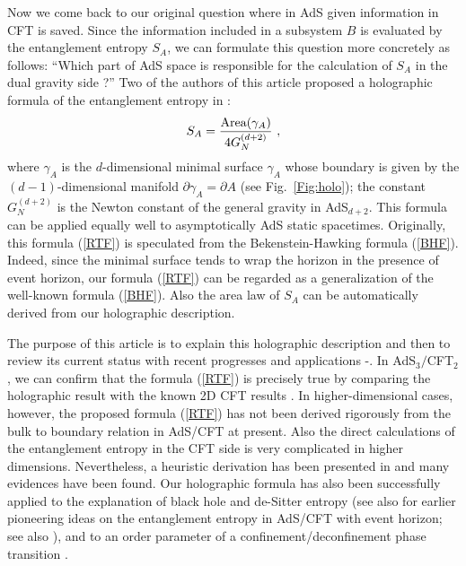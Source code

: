 \documentclass[12pt]{article}
\def\frac#1#2{{#1\over #2}}
\def\de{\partial}
\def\f {\frac}
\def\frac#1#2{{#1\over #2}}
\def\be{\begin{equation}}
\def\ee{\end{equation}}
\begin{document}
Now we come back to our original question where in AdS
given information in CFT is saved.
Since the information included in a subsystem $B$ is evaluated by the entanglement
entropy $S_A$, we can formulate this question more concretely as follows: ``Which part of
AdS space is responsible for the calculation of $S_A$ in the dual gravity side ?''
Two of the authors of this article proposed a holographic formula of the entanglement entropy
in \cite{RuTa,RuTaL}:
\be
S_A=\f{\mbox{Area}(\gamma_A)}{4G^{(d+2)}_N}\ , \label{RTF}
\ee
where $\gamma_A$ is the $d$-dimensional minimal surface $\gamma_A$ whose boundary is given
by the $(d-1)$-dimensional manifold
$\de \gamma_A=\de A$
(see Fig.\ \ref{Fig:holo}); the constant $G^{(d+2)}_N$ is
the Newton constant of the general gravity in AdS$_{d+2}$.
This formula can be applied equally well to asymptotically
AdS static spacetimes. Originally, this formula (\ref{RTF}) is speculated from
the Bekenstein-Hawking formula (\ref{BHF}). Indeed, since the minimal surface
tends to wrap the horizon in the presence of event horizon, our formula (\ref{RTF}) can be regarded as a
generalization of the well-known formula (\ref{BHF}).
Also the area law of $S_A$ \cite{Bombelli,Srednicki} can
be automatically derived from our holographic description.

The purpose of this article is to explain this holographic description and then
to review its current status with recent progresses and applications
\cite{Emparan:2006ni}-\cite{ALT}.
In AdS$_3/$CFT$_2$, we can confirm that the formula
(\ref{RTF}) is precisely true by comparing the holographic result with the known
2D CFT results
\cite{RuTa,RuTaL}.
In higher-dimensional cases, however, the proposed formula
 (\ref{RTF}) has not been derived rigorously from the bulk to boundary relation in AdS/CFT
 \cite{ADSGKP, ADSWitten} at present.
 Also the direct calculations of the entanglement entropy in the CFT side is very complicated in higher dimensions.
 Nevertheless,
a heuristic derivation has been presented in \cite{Fursaev:2006ih} and many evidences
\cite{RuTaL,Solodukhin:2006xv, Hirata:2006jx, Nishioka:2006gr, Headrick:2007km, Solodukhin:2008dh, Casini:2008as}
have been found. Our holographic formula has also been successfully applied to the explanation of black hole
and de-Sitter entropy \cite{Emparan:2006ni, Iwashita:2006zj, Solodukhin:2006xv, Azeyanagi:2007bj}
(see also \cite{HMS,MBH} for earlier pioneering ideas on the entanglement entropy in AdS/CFT with
event horizon; see also \cite{Einhorn}), and
to an order parameter of a confinement/deconfinement phase transition
\cite{Nishioka:2006gr, Klebanov:2007ws, Faraggi:2007fu, Buividovich:2008kq, Fujita:2008zv, Buividovich:2008gq, Bah:2008cj, Buividovich:2008yv}.
\end{document}
